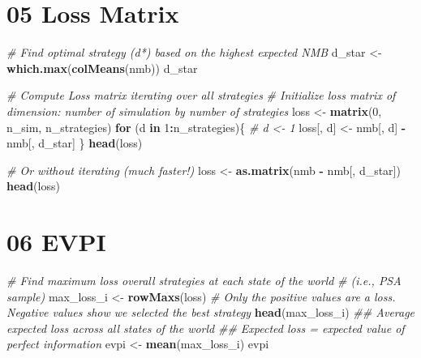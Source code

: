\documentclass[
]{article}
\newenvironment{Shaded}{\begin{snugshade}}{\end{snugshade}}
\newcommand{\CommentTok}[1]{\textcolor[rgb]{0.56,0.35,0.01}{\textit{#1}}}
\newcommand{\ControlFlowTok}[1]{\textcolor[rgb]{0.13,0.29,0.53}{\textbf{#1}}}
\newcommand{\DecValTok}[1]{\textcolor[rgb]{0.00,0.00,0.81}{#1}}
\newcommand{\KeywordTok}[1]{\textcolor[rgb]{0.13,0.29,0.53}{\textbf{#1}}}
\newcommand{\NormalTok}[1]{#1}
\newcommand{\OperatorTok}[1]{\textcolor[rgb]{0.81,0.36,0.00}{\textbf{#1}}}
\newcommand{\StringTok}[1]{\textcolor[rgb]{0.31,0.60,0.02}{#1}}
\begin{document}
\hypertarget{loss-matrix}{%
\section{05 Loss Matrix}\label{loss-matrix}}

\begin{Shaded}
\begin{Highlighting}[]
\CommentTok{# Find optimal strategy (d*) based on the highest expected NMB}
\NormalTok{d_star <-}\StringTok{ }\KeywordTok{which.max}\NormalTok{(}\KeywordTok{colMeans}\NormalTok{(nmb))}
\NormalTok{d_star}

\CommentTok{# Compute Loss matrix iterating over all strategies}
\CommentTok{# Initialize loss matrix of dimension: number of simulation by number of strategies}
\NormalTok{loss <-}\StringTok{ }\KeywordTok{matrix}\NormalTok{(}\DecValTok{0}\NormalTok{, n_sim, n_strategies)}
\ControlFlowTok{for}\NormalTok{ (d }\ControlFlowTok{in} \DecValTok{1}\OperatorTok{:}\NormalTok{n_strategies)\{ }\CommentTok{# d <- 1}
\NormalTok{  loss[, d] <-}\StringTok{ }\NormalTok{nmb[, d] }\OperatorTok{-}\StringTok{ }\NormalTok{nmb[, d_star]}
\NormalTok{\}}
\KeywordTok{head}\NormalTok{(loss)}

\CommentTok{# Or without iterating (much faster!)}
\NormalTok{loss <-}\StringTok{ }\KeywordTok{as.matrix}\NormalTok{(nmb }\OperatorTok{-}\StringTok{ }\NormalTok{nmb[, d_star])}
\KeywordTok{head}\NormalTok{(loss)}
\end{Highlighting}
\end{Shaded}

\hypertarget{evpi}{%
\section{06 EVPI}\label{evpi}}

\begin{Shaded}
\begin{Highlighting}[]
\CommentTok{# Find maximum loss overall strategies at each state of the world }
\CommentTok{# (i.e., PSA sample)}
\NormalTok{max_loss_i <-}\StringTok{ }\KeywordTok{rowMaxs}\NormalTok{(loss)  }\CommentTok{# Only the positive values are a loss. Negative values show we selected the best strategy}
\KeywordTok{head}\NormalTok{(max_loss_i)}
\CommentTok{## Average expected loss across all states of the world}
\CommentTok{## Expected loss = expected value of perfect information}
\NormalTok{evpi <-}\StringTok{ }\KeywordTok{mean}\NormalTok{(max_loss_i)}
\NormalTok{evpi}
\end{Highlighting}
\end{Shaded}
\end{document}
